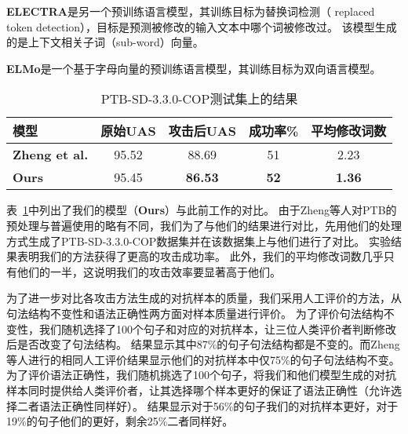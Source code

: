 \textbf{ELECTRA}\cite{clark2020electra}是另一个预训练语言模型，其训练目标为替换词检测（ replaced token detection），目标是预测被修改的输入文本中哪个词被修改过。
该模型生成的是上下文相关子词（sub-word）向量。

\textbf{ELMo}\cite{peters2018deep}是一个基于字母向量的预训练语言模型，其训练目标为双向语言模型。 

\begin{table}[h]
	\centering
	\small
	\renewcommand{\arraystretch}{1.2}
	\begin{tabular}{l|cccc}
		\hline
		\bf 模型& \bf 原始UAS & \bf 攻击后UAS & \bf 成功率\% & \bf 平均修改词数 \\
		\hline
		\bf Zheng et al. & 95.52 & 88.69 & 51 & 2.23 \\
		\textbf{Ours} & 95.45 & \bf 86.53 & \bf 52 & \bf 1.36 \\
		\hline
	\end{tabular}
	\caption{PTB-SD-3.3.0-COP测试集上的结果} 
	\label{tbl:attack-cop}
\end{table}

表~\ref{tbl:attack-cop}中列出了我们的模型（\textbf{Ours}）与此前工作的对比。
由于Zheng等人对PTB的预处理与普遍使用的略有不同，我们为了与他们的结果进行对比，先用他们的处理方式生成了PTB-SD-3.3.0-COP数据集并在该数据集上与他们进行了对比。
实验结果表明我们的方法获得了更高的攻击成功率。
此外，我们的平均修改词数几乎只有他们的一半，这说明我们的攻击效率要显著高于他们。

为了进一步对比各攻击方法生成的对抗样本的质量，我们采用人工评价的方法，从句法结构不变性和语法正确性两方面对样本质量进行评价。
为了评价句法结构不变性，我们随机选择了100个句子和对应的对抗样本，让三位人类评价者判断修改后是否改变了句法结构。
结果显示其中87\%的句子句法结构都是不变的。而Zheng等人进行的相同人工评价结果显示他们的对抗样本中仅75\%的句子句法结构不变。
为了评价语法正确性，我们随机挑选了100个句子，将我们和他们模型生成的对抗样本同时提供给人类评价者，让其选择哪个样本更好的保证了语法正确性（允许选择二者语法正确性同样好）。
结果显示对于56\%的句子我们的对抗样本更好，对于19\%的句子他们的更好，剩余25\%二者同样好。

